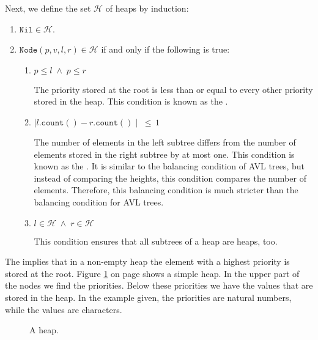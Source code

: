 Next, we define the set $\mathcal{H}$ of heaps by induction:
\begin{enumerate}
\item $\texttt{Nil} \in \mathcal{H}$.
\item $\texttt{Node}(p,v,l,r) \in \mathcal{H}$ if and only if the following is true:
      \begin{enumerate}
      \item $p \leq l \;\wedge\; p \leq r$

            The priority stored at the root is less than or equal to every other priority stored in
            the heap. This condition is known as the .
      \item $\mid l.\texttt{count}() - r.\texttt{count}() \mid \;\leq\, 1$

            The number of elements in the left subtree differs from the number of elements stored in
            the right subtree by at most one.
            This condition is known as the  .  It is similar to the
            balancing condition of AVL trees, but instead of comparing the heights, this condition
            compares the number of elements.  Therefore, this balancing condition is much stricter than the
            balancing condition for AVL trees.
      \item $l \in \mathcal{H} \;\wedge\; r \in \mathcal{H}$

            This condition ensures that all subtrees of a heap are heaps, too.
      \end{enumerate}
\end{enumerate}
The   implies that in a non-empty heap the element with a highest priority is
stored at the root.  Figure \ref{fig:heap-list} on page \pageref{fig:heap-list} shows a simple heap.
In the upper part of the nodes we find the priorities.  Below these priorities we have the values
that are stored in the heap.  In the example given, the priorities are natural numbers, while the
values are characters.


\begin{figure}[!t]
  \centering
  \caption{A heap.}
  \label{fig:heap-list}
\end{figure}

